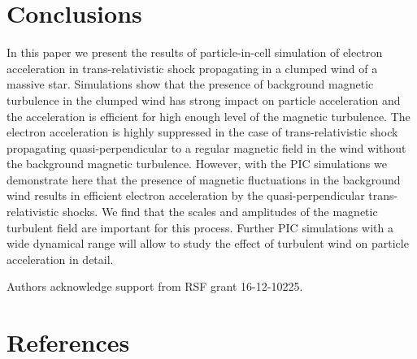 \documentclass[a4paper]{jpconf}
\begin{document}
\section{Conclusions}
In this paper we present the results of particle-in-cell simulation of electron acceleration in trans-relativistic shock propagating in a clumped  wind of a massive star. Simulations show that the presence  of background  magnetic turbulence in the clumped wind has strong impact on particle acceleration and the acceleration is efficient for high enough level of the magnetic turbulence. The electron acceleration is highly suppressed in the case of  trans-relativistic shock propagating quasi-perpendicular to a regular magnetic field in the wind without the background magnetic turbulence. However, with the PIC simulations we demonstrate here that the presence of magnetic fluctuations in the background wind results in efficient electron acceleration by the quasi-perpendicular trans-relativistic shocks. We find that the scales and amplitudes of the magnetic turbulent field are important for this process. Further PIC simulations with a wide dynamical range will allow to study the effect of turbulent wind on particle acceleration in detail.

\ack
Authors acknowledge support from RSF grant 16-12-10225.



\section*{References}



\end{document}
